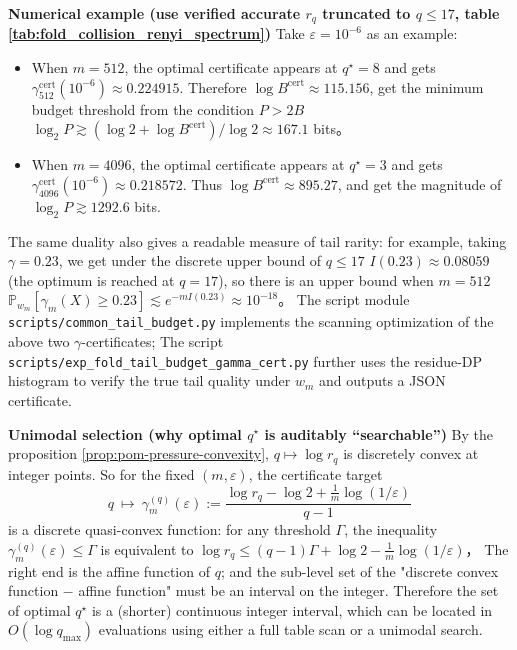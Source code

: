 \medskip\noindent\textbf{Numerical example (use verified accurate \texorpdfstring{$r_q$}{rq} truncated to \(q\le 17\), table \ref{tab:fold_collision_renyi_spectrum})}
Take \(\varepsilon=10^{-6}\) as an example:
\begin{itemize}
\item When \(m=512\), the optimal certificate appears at \(q^\star=8\) and gets \(\gamma^{\mathrm{cert}}_{512}(10^{-6})\approx 0.224915\).
Therefore \(\log B^{\mathrm{cert}}\approx 115.156\), get the minimum budget threshold from the condition \(P>2B\)
  \(\log_2 P\gtrsim (\log 2+\log B^{\mathrm{cert}})/\log 2\approx 167.1\) bits。
\item When \(m=4096\), the optimal certificate appears at \(q^\star=3\) and gets \(\gamma^{\mathrm{cert}}_{4096}(10^{-6})\approx 0.218572\).
Thus \(\log B^{\mathrm{cert}}\approx 895.27\), and get the magnitude of \(\log_2 P\gtrsim 1292.6\) bits.
\end{itemize}
The same duality also gives a readable measure of tail rarity: for example, taking \(\gamma=0.23\), we get under the discrete upper bound of \(q\le 17\)
\(I(0.23)\approx 0.08059\) (the optimum is reached at \(q=17\)), so there is an upper bound when \(m=512\)
\(\mathbb{P}_{w_m}[\gamma_m(X)\ge 0.23]\lesssim e^{-m I(0.23)}\approx 10^{-18}\)。
The script module \texttt{scripts/common\_tail\_budget.py} implements the scanning optimization of the above two \(\gamma\)-certificates;
The script \texttt{scripts/exp\_fold\_tail\_budget\_gamma\_cert.py} further uses the residue-DP histogram to verify the true tail quality under \(w_m\) and outputs a JSON certificate.
\par
\medskip\noindent\textbf{Unimodal selection (why optimal \(q^\star\) is auditably “searchable”)}
By the proposition \ref{prop:pom-pressure-convexity}, \(q\mapsto \log r_q\) is discretely convex at integer points.
So for the fixed \((m,\varepsilon)\), the certificate target
\[
q\ \longmapsto\ \gamma^{(q)}_{m}(\varepsilon)
:=\frac{\log r_q-\log 2+\frac{1}{m}\log(1/\varepsilon)}{q-1}
\]
is a discrete quasi-convex function: for any threshold \(\Gamma\), the inequality \(\gamma^{(q)}_m(\varepsilon)\le \Gamma\) is equivalent to
\(
\log r_q \le (q-1)\Gamma+\log 2-\frac{1}{m}\log(1/\varepsilon)
\)，
The right end is the affine function of \(q\); and the sub-level set of the "discrete convex function \(-\) affine function" must be an interval on the integer.
Therefore the set of optimal \(q^\star\) is a (shorter) continuous integer interval, which can be located in \(O(\log q_{\max})\) evaluations using either a full table scan or a unimodal search.

